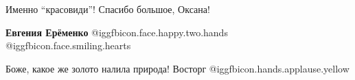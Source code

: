  
 
 
 
 

Именно \enquote{красовиди}! Спасибо большое, Оксана!

\textbf{Евгения Ерёменко}  @igg{fbicon.face.happy.two.hands}  @igg{fbicon.face.smiling.hearts} 


Боже, какое же золото налила природа! Восторг @igg{fbicon.hands.applause.yellow} 
